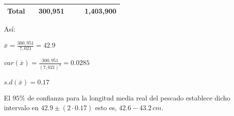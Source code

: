 \begin{table}[H]
\begin{tabular}{|l|l|l|l|l|l|}
\rowcolor[HTML]{FFCE93}
Total                                                            &                                                             & 300,951                                                        &                                                                 &                                                                             & 1,403,900                         \\ \hline
\end{tabular}
\end{table}


Así:

\bigbreak

$\overline{x} = \frac{300,951}{7,021} = 42.9$

\bigbreak

$var(\overline{x}) = \frac{300,951}{(7,021)^2} = 0.0285$

\bigbreak

$s.d(\overline{x}) = 0.17$

\bigbreak

El $95\%$ de confianza para la longitud media real del pescado establece dicho intervalo en $42.9 \pm (2 \cdot 0.17)$ esto es, $42.6-43.2 \, cm$.
